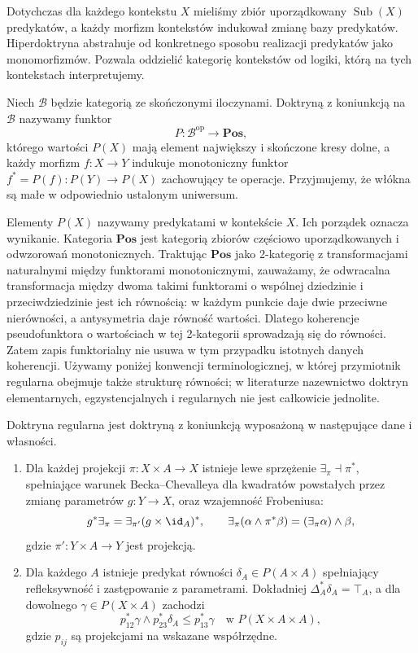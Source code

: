 Dotychczas dla każdego kontekstu $X$ mieliśmy zbiór uporządkowany $\operatorname{Sub}(X)$ predykatów, a każdy morfizm kontekstów indukował zmianę bazy predykatów. Hiperdoktryna abstrahuje od konkretnego sposobu realizacji predykatów jako monomorfizmów. Pozwala oddzielić kategorię kontekstów od logiki, którą na tych kontekstach interpretujemy.

\begin{definicja}\label{cat:def:cl-meet-doctrine}
Niech $\mathcal B$ będzie kategorią ze skończonymi iloczynami. Doktryną z koniunkcją na $\mathcal B$ nazywamy funktor
\[
 P:\mathcal B^{\mathrm{op}}\longrightarrow\mathbf{Pos},
\]
którego wartości $P(X)$ mają element największy i skończone kresy dolne, a każdy morfizm $f:X\to Y$ indukuje monotoniczny funktor $f^*=P(f):P(Y)\to P(X)$ zachowujący te operacje. Przyjmujemy, że włókna są małe w odpowiednio ustalonym uniwersum.
\end{definicja}

Elementy $P(X)$ nazywamy predykatami w kontekście $X$. Ich porządek oznacza wynikanie. Kategoria $\mathbf{Pos}$ jest kategorią zbiorów częściowo uporządkowanych i odwzorowań monotonicznych. Traktując $\mathbf{Pos}$ jako 2-kategorię z transformacjami naturalnymi między funktorami monotonicznymi, zauważamy, że odwracalna transformacja między dwoma takimi funktorami o wspólnej dziedzinie i przeciwdziedzinie jest ich równością: w każdym punkcie daje dwie przeciwne nierówności, a antysymetria daje równość wartości. Dlatego koherencje pseudofunktora o wartościach w tej 2-kategorii sprowadzają się do równości. Zatem zapis funktorialny nie usuwa w tym przypadku istotnych danych koherencji. Używamy poniżej konwencji terminologicznej, w której przymiotnik regularna obejmuje także strukturę równości; w literaturze nazewnictwo doktryn elementarnych, egzystencjalnych i regularnych nie jest całkowicie jednolite.

\begin{definicja}\label{cat:def:cl-regular-doctrine}
Doktryna regularna jest doktryną z koniunkcją wyposażoną w następujące dane i własności.
\begin{enumerate}
 \item Dla każdej projekcji $\pi:X\times A\to X$ istnieje lewe sprzężenie $\exists_\pi\dashv\pi^*$, spełniające warunek Becka--Chevalleya dla kwadratów powstałych przez zmianę parametrów $g:Y\to X$, oraz wzajemność Frobeniusa:
 \[
 g^*\exists_\pi=\exists_{\pi'}(g\times\id_A)^*,
 \qquad
 \exists_\pi(\alpha\wedge\pi^*\beta)=(\exists_\pi\alpha)\wedge\beta,
 \]
 gdzie $\pi':Y\times A\to Y$ jest projekcją.
 \item Dla każdego $A$ istnieje predykat równości $\delta_A\in P(A\times A)$ spełniający refleksywność i zastępowanie z parametrami. Dokładniej $\Delta_A^*\delta_A=\top_A$, a dla dowolnego $\gamma\in P(X\times A)$ zachodzi
 \[
 p_{12}^*\gamma\wedge p_{23}^*\delta_A\leq p_{13}^*\gamma
 \quad\text{w }P(X\times A\times A),
 \]
 gdzie $p_{ij}$ są projekcjami na wskazane współrzędne.
\end{enumerate}
\end{definicja}

